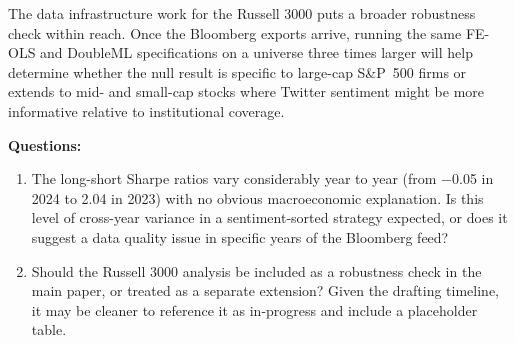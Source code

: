 \documentclass[12pt]{article}
\begin{document}
The data infrastructure work for the Russell 3000 puts a broader robustness check within reach.
Once the Bloomberg exports arrive, running the same FE-OLS and DoubleML specifications on a
universe three times larger will help determine whether the null result is specific to large-cap
S\&P~500 firms or extends to mid- and small-cap stocks where Twitter sentiment might be more
informative relative to institutional coverage.

\bigskip

\noindent\textbf{Questions:}

\begin{enumerate}
    \item The long-short Sharpe ratios vary considerably year to year (from $-$0.05 in 2024 to
    2.04 in 2023) with no obvious macroeconomic explanation. Is this level of cross-year variance
    in a sentiment-sorted strategy expected, or does it suggest a data quality issue in specific
    years of the Bloomberg feed?

    \item Should the Russell 3000 analysis be included as a robustness check in the main paper, or
    treated as a separate extension? Given the drafting timeline, it may be cleaner to reference it
    as in-progress and include a placeholder table.
\end{enumerate}
\end{document}
